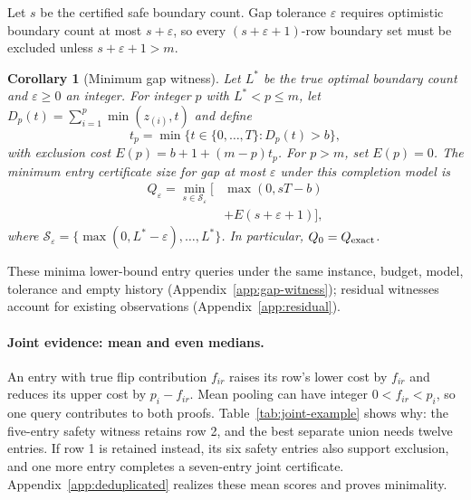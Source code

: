 \documentclass[11pt]{article}
\newtheorem{corollary}{Corollary}
\begin{document}
Let $s$ be the certified safe boundary count. Gap tolerance $\varepsilon$ requires optimistic boundary count at most $s+\varepsilon$, so every $(s+\varepsilon+1)$-row boundary set must be excluded unless $s+\varepsilon+1>m$.
\begin{corollary}[Minimum gap witness]
\label{cor:gap-witness}
Let $L^*$ be the true optimal boundary count and $\varepsilon\ge0$ an integer. For integer $p$ with $L^*<p\le m$, let $D_p(t)=\sum_{i=1}^{p}\min(z_{(i)},t)$ and define
\[
 t_p=\min\{t\in\{0,\ldots,T\}:D_p(t)>b\},
\]
with exclusion cost $E(p)=b+1+(m-p)t_p$. For $p>m$, set $E(p)=0$. The minimum entry certificate size for gap at most $\varepsilon$ under this completion model is
\begin{equation}
 \begin{aligned}
 Q_\varepsilon=\min_{s\in\mathcal S_\varepsilon}\big[&\max(0,sT-b)\\
 &+E(s+\varepsilon+1)\big],
 \end{aligned}
 \label{eq:gap-witness}
\end{equation}
where $\mathcal S_\varepsilon=\{\max(0,L^*-\varepsilon),\ldots,L^*\}$. In particular, $Q_0=Q_{\rm exact}$.
\end{corollary}
These minima lower-bound entry queries under the same instance, budget, model, tolerance and empty history (Appendix~\ref{app:gap-witness}); residual witnesses account for existing observations (Appendix~\ref{app:residual}).


\paragraph{Joint evidence: mean and even medians.}
An entry with true flip contribution $f_{ir}$ raises its row's lower cost by $f_{ir}$ and reduces its upper cost by $p_i-f_{ir}$. Mean pooling can have integer $0<f_{ir}<p_i$, so one query contributes to both proofs. Table~\ref{tab:joint-example} shows why: the five-entry safety witness retains row 2, and the best separate union needs twelve entries. If row 1 is retained instead, its six safety entries also support exclusion, and one more entry completes a seven-entry joint certificate. Appendix~\ref{app:deduplicated} realizes these mean scores and proves minimality.
\end{document}
